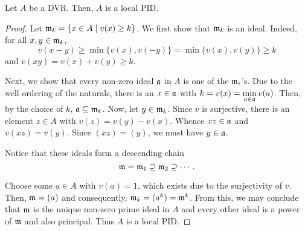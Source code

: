 \begin{proposition}
    Let $A$ be a DVR. Then, $A$ is a local PID.
\end{proposition}
\begin{proof}
    Let $\mathfrak m_k = \{x\in A\mid v(x)\ge k\}$. We first show that $\mathfrak m_k$ is an ideal. Indeed, for all $x,y\in\mathfrak m_k$, 
    \begin{equation*}
        v(x - y)\ge\min\{v(x), v(-y)\} = \min\{v(x),v(y)\}\ge k
    \end{equation*}
    and $v(xy) = v(x) + v(y)\ge k$.

    Next, we show that every non-zero ideal $\mathfrak a$ in $A$ is one of the $\mathfrak m_i$'s. Due to the well ordering of the naturals, there is an $x\in\mathfrak a$ with $\displaystyle k = v(x) = \min_{a\in\mathfrak a}v(a)$. Then, by the choice of $k$, $\mathfrak a\subseteq\mathfrak m_k$. Now, let $y\in\mathfrak m_k$. Since $v$ is surjective, there is an element $z\in A$ with $v(z) = v(y) - v(x)$. Whence $xz\in\mathfrak a$ and $v(xz) = v(y)$. Since $(xz) = (y)$, we must have $y\in\mathfrak a$.

    Notice that these ideals form a descending chain 
    \begin{equation*}
        \mathfrak m = \mathfrak m_1\supseteq\mathfrak m_2\supseteq\cdots.
    \end{equation*}

    Choose some $a\in A$ with $v(a) = 1$, which exists due to the surjectivity of $v$. Then, $\mathfrak m = (a)$ and consequently, $\mathfrak m_k = (a^k) = \mathfrak m^k$. From this, we may conclude that $\mathfrak m$ is the unique non-zero prime ideal in $A$ and every other ideal is a power of $\mathfrak m$ and also principal. Thus $A$ is a local PID.
\end{proof}

